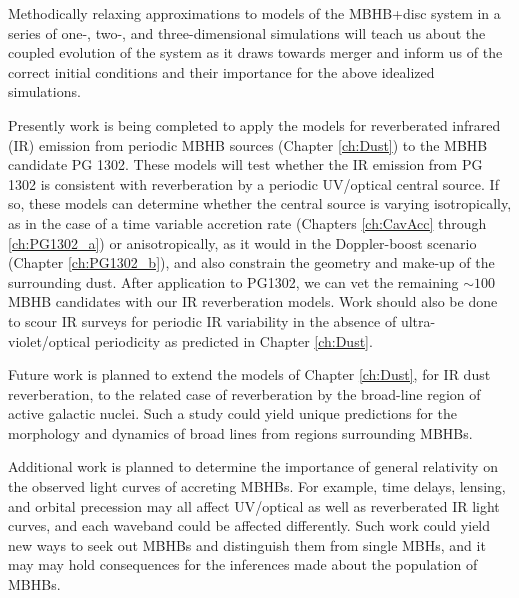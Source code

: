 Methodically relaxing approximations to models of the MBHB+disc system in a
series of one-, two-, and three-dimensional simulations will teach us about
the coupled evolution of the system as it draws towards merger and inform us
of the correct initial conditions and their importance for the above
idealized simulations.







Presently work is being completed to apply the models for reverberated infrared (IR)
emission from periodic MBHB sources (Chapter \ref{ch:Dust}) to the MBHB
candidate PG 1302. These models will test whether the IR emission from PG 1302
is consistent with reverberation by a periodic UV/optical central source. If
so, these models can determine whether the central source is varying
isotropically, as in the case of a time variable accretion rate (Chapters
\ref{ch:CavAcc} through \ref{ch:PG1302_a}) or anisotropically, as it would in
the Doppler-boost scenario (Chapter \ref{ch:PG1302_b}), and also constrain the
geometry and make-up of the surrounding dust. After application to PG1302, we
can vet the remaining $\sim100$ MBHB candidates \citep{Graham+2015b,
Charisi+2016} with our IR reverberation models. Work should also be done to
scour IR surveys for periodic IR variability in the absence of ultra-violet/optical
periodicity as predicted in Chapter \ref{ch:Dust}.


Future work is planned to extend the models of Chapter \ref{ch:Dust}, for
IR dust reverberation, to the related case of reverberation by the broad-line
region of active galactic nuclei. Such a study could yield unique predictions
for the morphology and dynamics of broad lines from regions surrounding MBHBs.

Additional work is planned to determine the importance of general relativity
on the observed light curves of accreting MBHBs. For example, time delays,
lensing, and orbital precession may all affect UV/optical as well as
reverberated IR light curves, and each waveband could be affected differently.
Such work could yield new ways to seek out MBHBs and distinguish them from
single MBHs, and it may may hold consequences for the inferences made about
the population of MBHBs.



